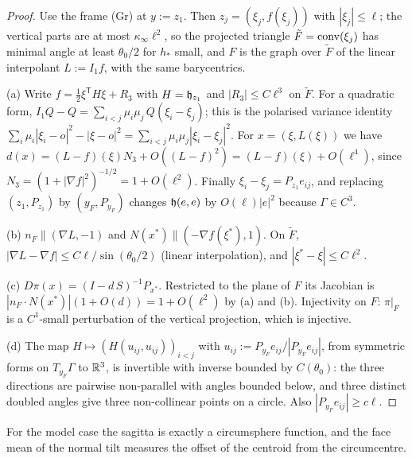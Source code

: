 \begin{proof}
Use the frame (Gr) at $y:=z_1$. Then $z_j=(\xi_j,f(\xi_j))$ with $|\xi_j|\le\ell$; the vertical parts are at most $\kappa_\infty\ell^2$, so the projected triangle $\tilde F=\operatorname{conv}(\xi_j)$ has minimal angle at least $\theta_0/2$ for $h_\ast$ small, and $F$ is the graph over $\tilde F$ of the linear interpolant $L:=I_1f$, with the same barycentrics.

(a) Write $f=\frac12\xi^{\mathsf T}H\xi+R_3$ with $H=\mathfrak h_{z_1}$ and $|R_3|\le C\ell^3$ on $\tilde F$. For a quadratic form, $I_1Q-Q=\sum_{i<j}\mu_i\mu_j\,Q(\xi_i-\xi_j)$; this is the polarised variance identity $\sum_i\mu_i|\xi_i-o|^2-|\xi-o|^2=\sum_{i<j}\mu_i\mu_j|\xi_i-\xi_j|^2$. For $x=(\xi,L(\xi))$ we have $d(x)=(L-f)(\xi)N_3+O((L-f)^2)=(L-f)(\xi)+O(\ell^4)$, since $N_3=(1+|\nabla f|^2)^{-1/2}=1+O(\ell^2)$. Finally $\xi_i-\xi_j=P_{z_1}e_{ij}$, and replacing $(z_1,P_{z_1})$ by $(y_F,P_{y_F})$ changes $\mathfrak h(e,e)$ by $O(\ell)|e|^2$ because $\Gamma\in C^3$.

(b) $n_F\parallel(\nabla L,-1)$ and $N(x^\ast)\parallel(-\nabla f(\xi^\ast),1)$. On $\tilde F$, $|\nabla L-\nabla f|\le C\ell/\sin(\theta_0/2)$ (linear interpolation), and $|\xi^\ast-\xi|\le C\ell^2$.

(c) $D\pi(x)=(I-d\,S)^{-1}P_{x^\ast}$. Restricted to the plane of $F$ its Jacobian is $|n_F\cdot N(x^\ast)|(1+O(d))=1+O(\ell^2)$ by (a) and (b). Injectivity on $F$: $\pi|_F$ is a $C^1$-small perturbation of the vertical projection, which is injective.

(d) The map $H\mapsto(H(u_{ij},u_{ij}))_{i<j}$ with $u_{ij}:=P_{y_F}e_{ij}/|P_{y_F}e_{ij}|$, from symmetric forms on $T_{y_F}\Gamma$ to $\mathbb R^3$, is invertible with inverse bounded by $C(\theta_0)$: the three directions are pairwise non-parallel with angles bounded below, and three distinct doubled angles give three non-collinear points on a circle. Also $|P_{y_F}e_{ij}|\ge c\ell$.
\end{proof}

For the model case the sagitta is exactly a circumsphere function, and the face mean of the normal tilt measures the offset of the centroid from the circumcentre.

